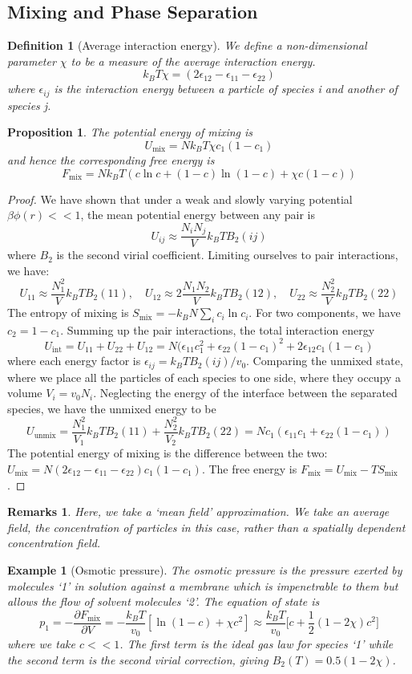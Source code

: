 \documentclass[a4paper]{article}
\newtheorem{eg}{Example}[section]
\newtheorem{remarks}{Remarks}[section]
\theoremstyle{new}
\newtheorem{defi}{Definition}[section]
\newtheorem{prop}{Proposition}[section]
\begin{document}
\subsection{Mixing and Phase Separation}
\begin{defi}[Average interaction energy]
We define a non-dimensional parameter $\chi$ to be a measure of the average interaction energy.
$$k_BT\chi=(2\epsilon_{12}-\epsilon_{11}-\epsilon_{22})$$
where $\epsilon_{ij}$ is the interaction energy between a particle of species i and another of species j.
\end{defi}
\begin{prop}
The potential energy of mixing is
$$U_{\text{mix}}=Nk_BT\chi c_1(1-c_1)$$
and hence the corresponding free energy is
$$F_{\text{mix}}=Nk_BT(c\ln c+(1-c)\ln(1-c)+\chi c(1-c))$$
\end{prop}
\begin{proof}
We have shown that under a weak and slowly varying potential $\beta\phi(r)<<1$, the mean potential energy between any pair is
$$U_{ij}\approx\frac{N_iN_j}{V}k_BTB_2(ij)$$
where $B_2$ is the second virial coefficient. Limiting ourselves to pair interactions, we have:
$$U_{11}\approx\frac{N_1^2}{V}k_BTB_2(11),\quad U_{12}\approx2\frac{N_1N_2}{V}k_BTB_2(12),\quad U_{22}\approx\frac{N_2^2}{V}k_BTB_2(22)$$
The entropy of mixing is $S_{\text{mix}}=-k_BN\sum_ic_i\ln c_i$. For two components, we have $c_2=1-c_1$. Summing up the pair interactions, the total interaction energy
$$U_{\text{int}}=U_{11}+U_{22}+U_{12}=N(\epsilon_{11}c_1^2+\epsilon_{22}(1-c_1)^2+2\epsilon_{12}c_1(1-c_1)$$
where each energy factor is $\epsilon_{ij}=k_BTB_2(ij)/v_0$. Comparing the unmixed state, where we place all the particles of each species to one side, where they occupy a volume $V_i=v_0N_i$. Neglecting the energy of the interface between the separated species, we have the unmixed energy to be
$$U_{\text{unmix}}=\frac{N_1^2}{V_1}k_BTB_2(11)+\frac{N_2^2}{V_2}k_BTB_2(22)=Nc_1(\epsilon_{11}c_1+\epsilon_{22}(1-c_1))$$
The potential energy of mixing is the difference between the two: $U_{\text{mix}}=N(2\epsilon_{12}-\epsilon_{11}-\epsilon_{22})c_1(1-c_1)$. The free energy is $F_{\text{mix}}=U_{\text{mix}}-TS_{\text{mix}}$.
\end{proof}
\begin{remarks}
Here, we take a `mean field' approximation. We take an average field, the concentration of particles in this case, rather than a spatially dependent concentration field.
\end{remarks}
\begin{eg}[Osmotic pressure]
The osmotic pressure is the pressure exerted by molecules `1' in solution against a membrane which is impenetrable to them but allows the flow of solvent molecules `2'. The equation of state is
$$p_1=-\frac{\partial F_{\text{mix}}}{\partial V}=-\frac{k_BT}{v_0}[\ln(1-c)+\chi c^2]\approx\frac{k_BT}{v_0}\bigg[c+\frac{1}{2}(1-2\chi)c^2\bigg]$$
where we take $c<<1$. The first term is the ideal gas law for species `1' while the second term is the second virial correction, giving $B_2(T)=0.5(1-2\chi)$.
\end{eg}
\end{document}
